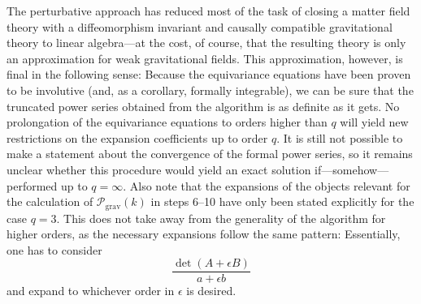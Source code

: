 The perturbative approach has reduced most of the task of closing a matter field theory with a diffeomorphism invariant and causally compatible gravitational theory to linear algebra---at the cost, of course, that the resulting theory is only an approximation for weak gravitational fields. This approximation, however, is final in the following sense: Because the equivariance equations have been proven to be involutive (and, as a corollary, formally integrable), we can be sure that the truncated power series obtained from the algorithm is as definite as it gets. No prolongation of the equivariance equations to orders higher than $q$ will yield new restrictions on the expansion coefficients up to order $q$. It is still not possible to make a statement about the convergence of the formal power series, so it remains unclear whether this procedure would yield an exact solution if---somehow---performed up to $q=\infty$. Also note that the expansions of the objects relevant for the calculation of $\mathcal P_\text{grav}(k)$ in steps 6--10 have only been stated explicitly for the case $q=3$. This does not take away from the generality of the algorithm for higher orders, as the necessary expansions follow the same pattern: Essentially, one has to consider
\begin{equation}
  \frac{\operatorname{det}(A + \epsilon B)}{a + \epsilon b}
\end{equation}
and expand to whichever order in $\epsilon$ is desired.

